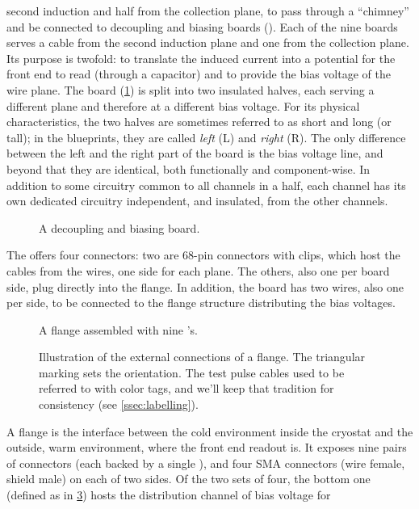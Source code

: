 second induction and half from the collection plane, to pass through a
``chimney'' and be connected to decoupling and biasing boards\cite{ICARUSDBB}
(\DBB).
Each of the nine boards serves a cable from the second induction plane and one
from the collection plane.
Its purpose is twofold: to translate the induced current into a potential for
the front end to read (through a  capacitor) and to provide the bias
voltage of the wire plane.
The board (\cref{fig:DBB}) is split into two insulated halves, each serving a
different plane and therefore at a different bias voltage.
For its physical characteristics, the two halves are sometimes referred to as
short and long (or tall); in the blueprints, they are called \emph{left} (L)
and \emph{right} (R).
The only difference between the left and the right part of the board is the bias
voltage line, and beyond that they are identical, both functionally and
component-wise.
In addition to some circuitry common to all channels in a half, each channel has
its own dedicated circuitry independent, and insulated, from the other channels.
\begin{figure}
  \caption{\label{fig:DBB}A decoupling and biasing board.}
\end{figure}
The \DBB offers four connectors: two are 68-pin connectors with clips, which
host the cables from the wires, one side for each plane.
The others, also one per board side, plug directly into the flange.
In addition, the board has two wires, also one per side, to be connected to the
flange structure distributing the bias voltages.
\begin{figure}
  \caption{\label{fig:AssembledFlange}
    A flange assembled with nine \DBB's.
  }
\end{figure}
\begin{figure}
  \caption{\label{fig:FlangeConnections}
    Illustration of the external connections of a flange.
    The triangular marking sets the orientation.
    The test pulse cables used to be referred to with color tags, and we'll keep
    that tradition for consistency (see \cref{ssec:labelling}).
  }
\end{figure}
A flange is the interface between the cold environment inside the cryostat and 
the outside, warm environment, where the front end readout is.
It exposes nine pairs of connectors (each backed by a single \DBB), and four SMA
connectors (wire female, shield male) on each of two sides.
Of the two sets of four, the bottom one (defined as in
\cref{fig:FlangeConnections}) hosts the distribution channel of bias voltage for
